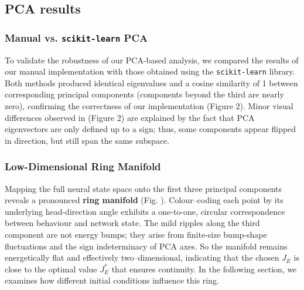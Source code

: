 \documentclass[11pt,a4paper]{article}
\begin{document}
\subsection{PCA results}

\subsubsection*{Manual vs. \texttt{scikit-learn} PCA}

To validate the robustness of our PCA-based analysis, we compared the results of our manual implementation with those obtained using the \texttt{scikit-learn} library. 
Both methods produced identical eigenvalues and a cosine similarity of 1 between corresponding principal components (components beyond the third are nearly zero), confirming the correctness of our implementation (Figure 2). Minor visual differences observed in (Figure 2) are explained by the fact that PCA eigenvectors are only defined up to a sign; thus, some components appear flipped in direction, but still span the same subspace.




\subsubsection*{Low-Dimensional Ring Manifold}

Mapping the full neural state space onto the first three principal components reveals a pronounced \textbf{ring manifold} (Fig. ).
Colour–coding each point by its underlying head-direction angle exhibits a one-to-one, circular correspondence between behaviour and network state. 
The mild ripples along the third component are not energy bumps; they arise from finite-size bump-shape fluctuations and the sign indeterminacy of PCA axes. 
So the manifold remains energetically flat and effectively two–dimensional, indicating that the chosen $J_E$ is close to the optimal value $J_E^{\ast}$ that ensures continuity. 
In the following section, we examines how different initial conditions influence this ring.
\end{document}

